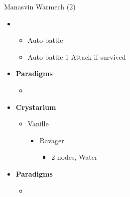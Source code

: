 \begin{paracol}{2}
\begin{battle}{Manasvin Warmech (2)}
\begin{itemize}
\begin{itemize}
			      \end{itemize}
			\item \third
			      \begin{itemize}
				      \item Auto-battle
				      \item Auto-battle 1 Attack if survived
			      \end{itemize}
		\end{itemize}
	\end{battle}
	\switchcolumn*
	\begin{menu}
		\begin{itemize}
			\item \textbf{Paradigms}
			      \begin{itemize}
				      \item {}%
				            {\paradigmline[1]{\textit{\com}}{\textit{\rav}}{\textit{\rav}}}%
				            {\paradigmline{\com}{\med}{\rav}}%
				            {\paradigmline{[\rav]}{\rav}{\rav}}%
				            {\paradigmline{[\rav]}{\rav}{\rav}}%
				            {\paradigmline{[\com]}{\rav}{\rav}}
			      \end{itemize}
			\item \textbf{Crystarium}
			      \begin{itemize}
				      \item Vanille
				            \begin{itemize}
					            \item Ravager
					                  \begin{itemize}
						                  \item 2 nodes, Water
					                  \end{itemize}
				            \end{itemize}
			      \end{itemize}
		\end{itemize}
	\end{menu}

	\renewcommand{\first}{[1] Relentless Assault (\com/\rav/\rav)}
	\renewcommand{\second}{[2] Diversity (\com/\med/\rav)}
	\renewcommand{\third}{[3] Tri-Disaster (\rav/\rav/\rav)}
	\renewcommand{\fourth}{[4] Tri-Disaster (\rav/\rav/\rav)}
	\renewcommand{\fifth}{[5] Relentless Assault (\com/\rav/\rav)}
	\switchcolumn
\begin{menu}
\begin{itemize}
    \item \textbf{Paradigms}
    \begin{itemize}
        \item {}%
{\paradigmline[1]{\textit{\com}}{\textit{\rav}}{\textit{\rav}}}%
{\paradigmline{\com}{\med}{\rav}}%
{\paradigmline{[\rav]}{\rav}{\rav}}%
{\paradigmline{[\rav]}{\rav}{\rav}}%
{\paradigmline{[\com]}{\rav}{\rav}}
    \end{itemize}
\end{itemize}
\end{menu}
\switchcolumn*


\end{paracol}
